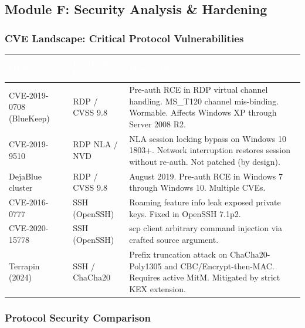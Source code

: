 \documentclass[11pt,letterpaper]{article}
\newcommand{\tableheader}[1]{\textbf{\sffamily\textcolor{white}{#1}}}
\begin{document}
\subsection{Module F: Security Analysis \& Hardening}

\subsubsection{CVE Landscape: Critical Protocol Vulnerabilities}

\begin{center}
\begin{tabularx}{\textwidth}{L{3.5cm}L{3cm}X}
\toprule
{}
\tableheader{CVE} & \tableheader{Protocol / Score} & \tableheader{Description} \\
\midrule
CVE-2019-0708 (BlueKeep) & RDP / CVSS 9.8 & Pre-auth RCE in RDP virtual channel handling. MS\_T120 channel mis-binding. Wormable. Affects Windows XP through Server 2008 R2. \\
CVE-2019-9510 & RDP NLA / NVD & NLA session locking bypass on Windows 10 1803+. Network interruption restores session without re-auth. Not patched (by design). \\
DejaBlue cluster & RDP / CVSS 9.8 & August 2019. Pre-auth RCE in Windows 7 through Windows 10. Multiple CVEs. \\
CVE-2016-0777 & SSH (OpenSSH) & Roaming feature info leak exposed private keys. Fixed in OpenSSH 7.1p2. \\
CVE-2020-15778 & SSH (OpenSSH) & scp client arbitrary command injection via crafted source argument. \\
Terrapin (2024) & SSH / ChaCha20 & Prefix truncation attack on ChaCha20-Poly1305 and CBC/Encrypt-then-MAC. Requires active MitM. Mitigated by strict KEX extension. \\
\bottomrule
\end{tabularx}
\end{center}

\subsubsection{Protocol Security Comparison}
\end{document}
